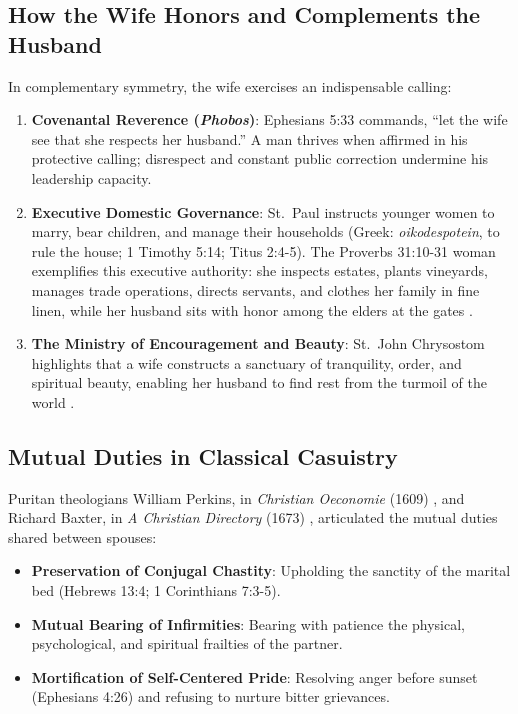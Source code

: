 \documentclass[11pt,twocolumn]{article}
\begin{document}
\subsection{How the Wife Honors and Complements the Husband}
In complementary symmetry, the wife exercises an indispensable calling:
\begin{enumerate}
    \item \textbf{Covenantal Reverence (\textit{Phobos})}: Ephesians 5:33 commands, ``let the wife see that she respects her husband.'' A man thrives when affirmed in his protective calling; disrespect and constant public correction undermine his leadership capacity.
    \item \textbf{Executive Domestic Governance}: St.~Paul instructs younger women to marry, bear children, and manage their households (Greek: \textit{oikodespotein}, to rule the house; 1 Timothy 5:14; Titus 2:4-5). The Proverbs 31:10-31 woman exemplifies this executive authority: she inspects estates, plants vineyards, manages trade operations, directs servants, and clothes her family in fine linen, while her husband sits with honor among the elders at the gates \cite{luther_estate, calvin_inst}.
    \item \textbf{The Ministry of Encouragement and Beauty}: St.~John Chrysostom highlights that a wife constructs a sanctuary of tranquility, order, and spiritual beauty, enabling her husband to find rest from the turmoil of the world \cite{chrysostom_marriage}.
\end{enumerate}

\subsection{Mutual Duties in Classical Casuistry}
Puritan theologians William Perkins, in \textit{Christian Oeconomie} (1609) \cite{perkins}, and Richard Baxter, in \textit{A Christian Directory} (1673) \cite{baxter}, articulated the mutual duties shared between spouses:
\begin{itemize}
    \item \textbf{Preservation of Conjugal Chastity}: Upholding the sanctity of the marital bed (Hebrews 13:4; 1 Corinthians 7:3-5).
    \item \textbf{Mutual Bearing of Infirmities}: Bearing with patience the physical, psychological, and spiritual frailties of the partner.
    \item \textbf{Mortification of Self-Centered Pride}: Resolving anger before sunset (Ephesians 4:26) and refusing to nurture bitter grievances.
\end{itemize}
\end{document}
